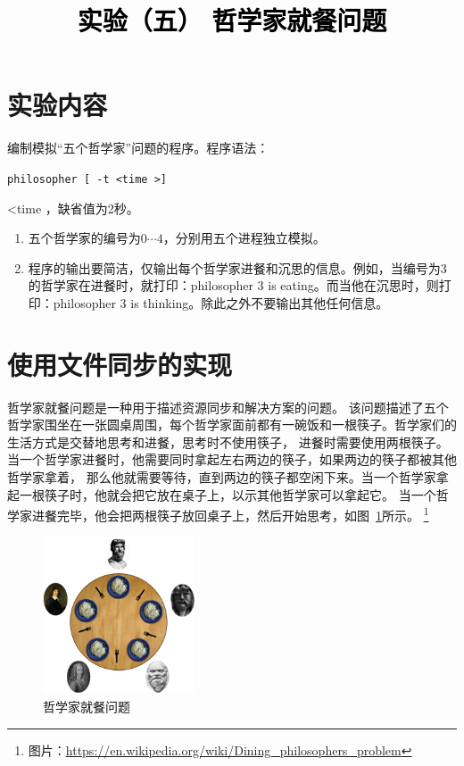 \documentclass[a4paper,twoside]{article}
\newcommand{\PaperTitle}{实验（五） 哲学家就餐问题}  %
\begin{document}
\newpage

\title{
	\Large{\textcolor{black}{\PaperTitle}}
}
	
	
\maketitle
	
\tableofcontents
 
\newpage
\setcounter{page}{1}

\begin{spacing}{1.2}

\section{实验内容}

编制模拟“五个哲学家”问题的程序。程序语法：
\begin{center}
	\texttt{philosopher   [ -t  \textless time \textgreater ]	}
\end{center}
\textless time ，缺省值为2秒。
\begin{enumerate}
    \item 五个哲学家的编号为$0\cdots4$，分别用五个进程独立模拟。
	\item 程序的输出要简洁，仅输出每个哲学家进餐和沉思的信息。例如，当编号为3的哲学家在进餐时，就打印：philosopher 3 is eating。而当他在沉思时，则打印：philosopher 3 is thinking。除此之外不要输出其他任何信息。
\end{enumerate}

\section{使用文件同步的实现}

哲学家就餐问题是一种用于描述资源同步和解决方案的问题\cite{wiki:dpp}。
该问题描述了五个哲学家围坐在一张圆桌周围，每个哲学家面前都有一碗饭和一根筷子。哲学家们的生活方式是交替地思考和进餐，思考时不使用筷子，
进餐时需要使用两根筷子。当一个哲学家进餐时，他需要同时拿起左右两边的筷子，如果两边的筷子都被其他哲学家拿着，
那么他就需要等待，直到两边的筷子都空闲下来。当一个哲学家拿起一根筷子时，他就会把它放在桌子上，以示其他哲学家可以拿起它。
当一个哲学家进餐完毕，他会把两根筷子放回桌子上，然后开始思考\cite{wiki:Dining_philosophers_problem}，如图~\ref{fig:philosopher}所示。
\footnote{图片：\url{https://en.wikipedia.org/wiki/Dining_philosophers_problem}}

\begin{figure}[h]
	\centering
	\caption{哲学家就餐问题}
	\label{fig:philosopher}
	\includegraphics[width=0.4\textwidth]{philosopher.png}
\end{figure}


\end{spacing}
\end{document}
